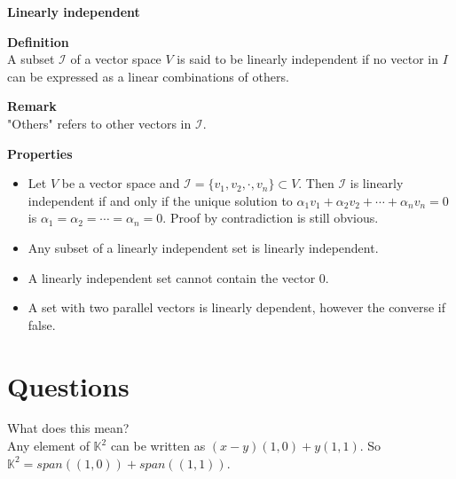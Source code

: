 \documentclass{article}
\begin{document}
\begin{framed}

    \textbf{Linearly independent}
    
    \begin{framed}
    \textbf{Definition}\\
    A subset $\mathcal{I}$ of a vector space $V$ is said to be linearly independent if no vector in $I$ can be expressed as a linear combinations of others.
    \begin{framed}
    \textbf{Remark}\\
    "Others" refers to other vectors in $\mathcal{I}$.
    \end{framed}
    
    \end{framed}
    
    \begin{framed}
        \textbf{Properties}
        \begin{itemize}
            \item Let $V$ be a vector space and $\mathcal{I}=\{v_{1},v_{2},\cdot,v_{n}\}\subset V$. Then $\mathcal{I}$ is linearly independent if and only if the unique solution to $\alpha _{1}v_{1}+\alpha _{2}v_{2}+\cdots +\alpha _{n}v_{n}=0$ is $\alpha _{1}=\alpha _{2}=\cdots =\alpha _{n}=0$. Proof by contradiction is still obvious.
            \item Any subset of a linearly independent set is linearly independent.
            \item A linearly independent set cannot contain the vector $0$.
            \item A set with two parallel vectors is linearly dependent, however the converse if false.
        \end{itemize}
    \end{framed}
    
\end{framed}

\section{Questions}

\begin{framed}
    What does this mean?\\
    Any element of $\mathbb{K}^{2}$ can be written as $(x-y)(1,0) + y(1,1)$. So $\mathbb{K}^{2}=span((1,0))+span((1,1))$.
\end{framed}
\end{document}
